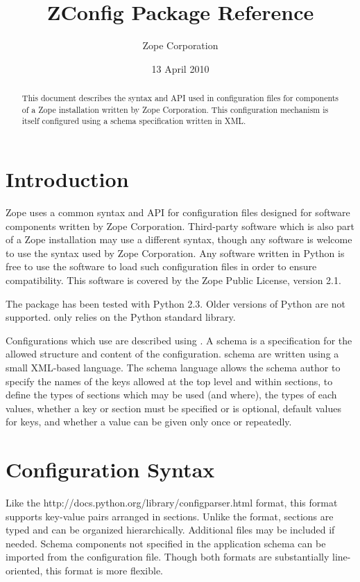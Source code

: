 \documentclass{howto}
\title{ZConfig Package Reference}
\date{13 April 2010}
\author{Zope Corporation}
\begin{document}
\maketitle

\begin{abstract}
\noindent
This document describes the syntax and API used in configuration files
for components of a Zope installation written by Zope Corporation.  This
configuration mechanism is itself configured using a schema specification
written in XML.
\end{abstract}

\tableofcontents


\section{Introduction \label{intro}}

Zope uses a common syntax and API for configuration files designed for
software components written by Zope Corporation.  Third-party software
which is also part of a Zope installation may use a different syntax,
though any software is welcome to use the syntax used by Zope
Corporation.  Any software written in Python is free to use the
 software to load such configuration files in order to
ensure compatibility.  This software is covered by the Zope Public
License, version 2.1.

The  package has been tested with Python 2.3.  Older
versions of Python are not supported.
 only relies on the Python standard library.

Configurations which use  are described using
.  A schema is a specification for the allowed structure
and content of the configuration.   schema are written
using a small XML-based language.  The schema language allows the
schema author to specify the names of the keys allowed at the top
level and within sections, to define the types of sections which may
be used (and where), the types of each values, whether a key or
section must be specified or is optional, default values for keys, and
whether a value can be given only once or repeatedly.


\section{Configuration Syntax \label{syntax}}

Like the 
{http://docs.python.org/library/configparser.html}
format, this format supports key-value pairs arranged in sections.
Unlike the  format, sections are typed and can be
organized hierarchically.
Additional files may be included if needed.  Schema components not
specified in the application schema can be imported from the
configuration file.  Though both formats are substantially
line-oriented, this format is more flexible.
\end{document}
